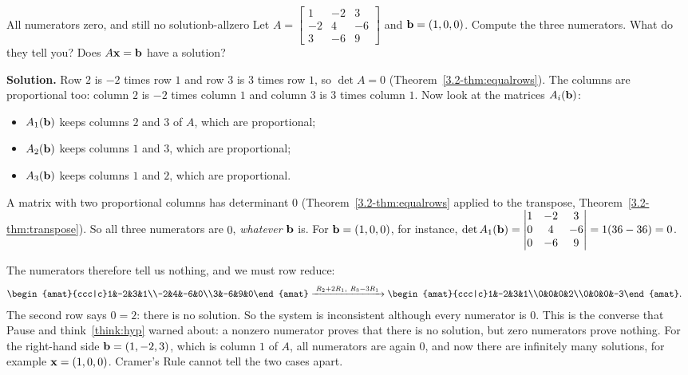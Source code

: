 \documentclass[11pt]{article}
\begin{document}
\begin{exmp}{All numerators zero, and still no solution}{b-allzero}
Let $A=\begin{bmatrix}1&-2&3\\-2&4&-6\\3&-6&9\end{bmatrix}$ and $\mathbf{b}=(1,0,0)$. Compute the three numerators. What do they tell you? Does $A\mathbf{x}=\mathbf{b}$ have a solution?

\textbf{Solution.} Row $2$ is $-2$ times row $1$ and row $3$ is $3$ times row $1$, so $\det A=0$ (Theorem~\ref{3.2-thm:equalrows}). The columns are proportional too: column $2$ is $-2$ times column $1$ and column $3$ is $3$ times column $1$. Now look at the matrices $A_i(\mathbf{b})$:
\begin{itemize}
  \item $A_1(\mathbf{b})$ keeps columns $2$ and $3$ of $A$, which are proportional;
  \item $A_2(\mathbf{b})$ keeps columns $1$ and $3$, which are proportional;
  \item $A_3(\mathbf{b})$ keeps columns $1$ and $2$, which are proportional.
\end{itemize}
A matrix with two proportional columns has determinant $0$ (Theorem~\ref{3.2-thm:equalrows} applied to the transpose, Theorem~\ref{3.2-thm:transpose}). So all three numerators are $0$, \emph{whatever} $\mathbf{b}$ is. For $\mathbf{b}=(1,0,0)$, for instance, $\det A_1(\mathbf{b})=\begin{vmatrix}1&-2&3\\0&4&-6\\0&-6&9\end{vmatrix}=1(36-36)=0$.

The numerators therefore tell us nothing, and we must row reduce:
\begin{align*}
\begin{amat}{ccc|c}1&-2&3&1\\-2&4&-6&0\\3&-6&9&0\end{amat}
&\rops{R_2+2R_1,\ R_3-3R_1}
\begin{amat}{ccc|c}1&-2&3&1\\0&0&0&2\\0&0&0&-3\end{amat}.
\end{align*}
The second row says $0=2$: there is no solution. So the system is inconsistent although every numerator is $0$. This is the converse that Pause and think~\ref{think:hyp} warned about: a nonzero numerator proves that there is no solution, but zero numerators prove nothing. For the right-hand side $\mathbf{b}=(1,-2,3)$, which is column $1$ of $A$, all numerators are again $0$, and now there are infinitely many solutions, for example $\mathbf{x}=(1,0,0)$. Cramer's Rule cannot tell the two cases apart.
\end{exmp}
\end{document}
